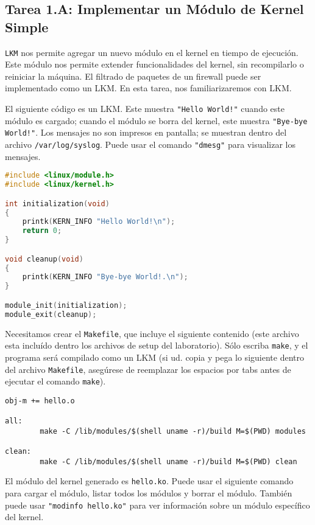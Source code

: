 \subsection{Tarea 1.A: Implementar un Módulo de Kernel Simple}

{\tt LKM} nos permite agregar un nuevo módulo en el kernel en tiempo de ejecución.
Este módulo nos permite extender funcionalidades del kernel, sin recompilarlo o reiniciar la máquina.
El filtrado de paquetes de un firewall puede ser implementado como un LKM.
En esta tarea, nos familiarizaremos con LKM.

El siguiente código es un LKM. Este muestra \texttt{"Hello World!"} cuando este módulo es cargado; cuando el módulo se borra del kernel, este muestra \texttt{"Bye-bye World!"}.
Los mensajes no son impresos en pantalla; se muestran dentro del archivo \texttt{/var/log/syslog}. Puede usar el comando \texttt{"dmesg"} para visualizar los mensajes.


\begin{lstlisting}[language=C, caption=\texttt{hello.c} (included in the lab setup files)]
#include <linux/module.h>
#include <linux/kernel.h>

int initialization(void)
{
    printk(KERN_INFO "Hello World!\n");
    return 0;
}

void cleanup(void)
{
    printk(KERN_INFO "Bye-bye World!.\n");
}

module_init(initialization);
module_exit(cleanup);
\end{lstlisting}

Necesitamos crear el {\tt Makefile}, que incluye el siguiente contenido (este archivo esta incluído dentro los archivos de setup del laboratorio).
Sólo escriba {\tt make}, y el programa será compilado como un LKM (si ud. copia y pega lo siguiente dentro del archivo \texttt{Makefile}, asegúrese de reemplazar los espacios por tabs antes de ejecutar el comando \texttt{make}).


\begin{lstlisting}
obj-m += hello.o

all:
        make -C /lib/modules/$(shell uname -r)/build M=$(PWD) modules

clean:
        make -C /lib/modules/$(shell uname -r)/build M=$(PWD) clean
\end{lstlisting}

El módulo del kernel generado es \texttt{hello.ko}. 
Puede usar el siguiente comando para cargar el módulo, listar todos los módulos y borrar el módulo.
También puede usar \texttt{"modinfo hello.ko"} para ver información sobre un módulo específico del kernel.

